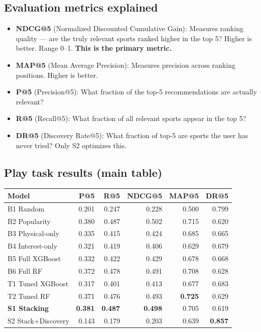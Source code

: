 \documentclass[12pt,a4paper]{article}
\begin{document}
\subsection{Evaluation metrics explained}

\begin{itemize}
\item \textbf{NDCG@5} (Normalized Discounted Cumulative Gain): Measures
ranking quality --- are the truly relevant sports ranked higher in the top 5?
Higher is better. Range 0--1. \textbf{This is the primary metric.}
\item \textbf{MAP@5} (Mean Average Precision): Measures precision across
ranking positions. Higher is better.
\item \textbf{P@5} (Precision@5): What fraction of the top-5 recommendations
are actually relevant?
\item \textbf{R@5} (Recall@5): What fraction of all relevant sports appear
in the top 5?
\item \textbf{DR@5} (Discovery Rate@5): What fraction of top-5 are sports
the user has never tried? Only S2 optimizes this.
\end{itemize}

\subsection{Play task results (main table)}

\begin{center}
\begin{tabular}{lrrrrr}
\toprule
\textbf{Model} & \textbf{P@5} & \textbf{R@5} & \textbf{NDCG@5} & \textbf{MAP@5} & \textbf{DR@5} \\
\midrule
B1 Random         & 0.201 & 0.247 & 0.228 & 0.500 & 0.799 \\
B2 Popularity     & 0.380 & 0.487 & 0.502 & 0.715 & 0.620 \\
B3 Physical-only  & 0.335 & 0.415 & 0.424 & 0.685 & 0.665 \\
B4 Interest-only  & 0.321 & 0.419 & 0.406 & 0.629 & 0.679 \\
B5 Full XGBoost   & 0.332 & 0.422 & 0.429 & 0.678 & 0.668 \\
B6 Full RF        & 0.372 & 0.478 & 0.491 & 0.708 & 0.628 \\
\midrule
T1 Tuned XGBoost  & 0.317 & 0.401 & 0.413 & 0.677 & 0.683 \\
T2 Tuned RF       & 0.371 & 0.476 & 0.493 & \textbf{0.725} & 0.629 \\
\textbf{S1 Stacking} & \textbf{0.381} & \textbf{0.487} & \textbf{0.498} & 0.705 & 0.619 \\
S2 Stack+Discovery & 0.143 & 0.179 & 0.203 & 0.639 & \textbf{0.857} \\
\bottomrule
\end{tabular}
\end{center}
\end{document}
